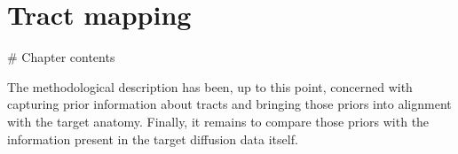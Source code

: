 \chapter{Tract mapping}
\label{chapterlabel4}

\begin{markdown}

  # Chapter contents

\end{markdown}

The methodological description has been, up to this point, concerned with capturing
prior information about tracts and bringing those priors into alignment with the target anatomy.
Finally, it remains to compare those priors with the information present in the target diffusion data itself.